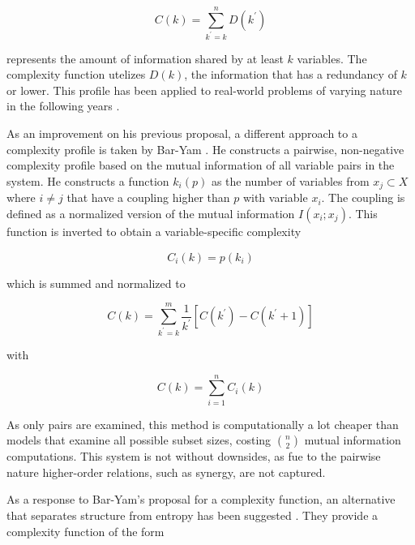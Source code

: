 \documentclass[../main.tex]{subfiles}
\begin{document}
\begin{equation}
C(k) = \sum_{k^\prime = k}^n D(k^\prime)
\end{equation}

represents the amount of information shared by at least $k$ variables.
The complexity function utelizes $D(k)$, the information that has a redundancy of $k$ or lower.
This profile has been applied to real-world problems of varying nature in the following years \cite{bar2013computationally}.

As an improvement on his previous proposal, a different approach to a complexity profile is taken by Bar-Yam \cite{bar2013computationally}.
He constructs a pairwise, non-negative complexity profile based on the mutual information of all variable pairs in the system.
He constructs a function $k_i (p)$ as the number of variables from $x_j \subset X$ where $i \ne j$ that have a coupling higher than $p$ with variable $x_i$.
The coupling is defined as a normalized version of the mutual information $I(x_i;x_j)$.
This function is inverted to obtain a variable-specific complexity

\begin{equation}
\overset{~}{C}_i(k) = p(k_i)
\end{equation}

which is summed and normalized to

\begin{equation}
C(k) = \sum_{k^\prime= k}^m \frac{1}{k^\prime} [\overset{~}{C} (k^\prime) - \overset{~}{C} (k^\prime + 1)]
\end{equation}

with

\begin{equation}
\overset{~}{C} (k) = \sum_{i=1}^n \overset{~}{C}_i (k)
\end{equation}

As only pairs are examined, this method is computationally a lot cheaper than models that examine all possible subset sizes, costing $\binom{n}{2}$ mutual information computations.
This system is not without downsides, as fue to the pairwise nature higher-order relations, such as synergy, are not captured.

As a response to Bar-Yam's proposal for a complexity function, an alternative that separates structure from entropy has been suggested \cite{arbona2014statistical}.
They provide a complexity function of the form
\end{document}
